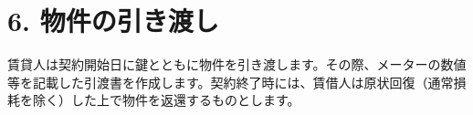 \section*{6. 物件の引き渡し}
賃貸人は契約開始日に鍵とともに物件を引き渡します。その際、メーターの数値等を記載した引渡書を作成します。契約終了時には、賃借人は原状回復（通常損耗を除く）した上で物件を返還するものとします。
